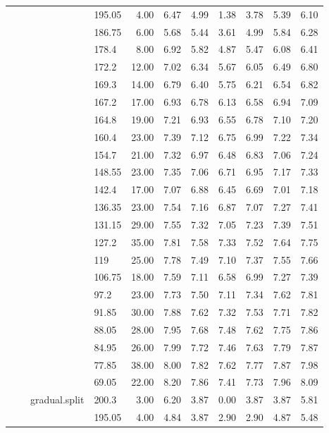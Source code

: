 \begin{longtable}{llllrrrrrrr}
   &  &  & 195.05 & 4.00 & 6.47 & 4.99 & 1.38 & 3.78 & 5.39 & 6.10 \\ 
   &  &  & 186.75 & 6.00 & 5.68 & 5.44 & 3.61 & 4.99 & 5.84 & 6.28 \\ 
   &  &  & 178.4 & 8.00 & 6.92 & 5.82 & 4.87 & 5.47 & 6.08 & 6.41 \\ 
   &  &  & 172.2 & 12.00 & 7.02 & 6.34 & 5.67 & 6.05 & 6.49 & 6.80 \\ 
   &  &  & 169.3 & 14.00 & 6.79 & 6.40 & 5.75 & 6.21 & 6.54 & 6.82 \\ 
   &  &  & 167.2 & 17.00 & 6.93 & 6.78 & 6.13 & 6.58 & 6.94 & 7.09 \\ 
   &  &  & 164.8 & 19.00 & 7.21 & 6.93 & 6.55 & 6.78 & 7.10 & 7.20 \\ 
   &  &  & 160.4 & 23.00 & 7.39 & 7.12 & 6.75 & 6.99 & 7.22 & 7.34 \\ 
   &  &  & 154.7 & 21.00 & 7.32 & 6.97 & 6.48 & 6.83 & 7.06 & 7.24 \\ 
   &  &  & 148.55 & 23.00 & 7.35 & 7.06 & 6.71 & 6.95 & 7.17 & 7.33 \\ 
   &  &  & 142.4 & 17.00 & 7.07 & 6.88 & 6.45 & 6.69 & 7.01 & 7.18 \\ 
   &  &  & 136.35 & 23.00 & 7.54 & 7.16 & 6.87 & 7.07 & 7.27 & 7.41 \\ 
   &  &  & 131.15 & 29.00 & 7.55 & 7.32 & 7.05 & 7.23 & 7.39 & 7.51 \\ 
   &  &  & 127.2 & 35.00 & 7.81 & 7.58 & 7.33 & 7.52 & 7.64 & 7.75 \\ 
   &  &  & 119 & 25.00 & 7.78 & 7.49 & 7.10 & 7.37 & 7.55 & 7.66 \\ 
   &  &  & 106.75 & 18.00 & 7.59 & 7.11 & 6.58 & 6.99 & 7.27 & 7.39 \\ 
   &  &  & 97.2 & 23.00 & 7.73 & 7.50 & 7.11 & 7.34 & 7.62 & 7.81 \\ 
   &  &  & 91.85 & 30.00 & 7.88 & 7.62 & 7.32 & 7.53 & 7.71 & 7.82 \\ 
   &  &  & 88.05 & 28.00 & 7.95 & 7.68 & 7.48 & 7.62 & 7.75 & 7.86 \\ 
   &  &  & 84.95 & 26.00 & 7.99 & 7.72 & 7.46 & 7.63 & 7.79 & 7.87 \\ 
   &  &  & 77.85 & 38.00 & 8.00 & 7.82 & 7.62 & 7.77 & 7.87 & 7.98 \\ 
   &  &  & 69.05 & 22.00 & 8.20 & 7.86 & 7.41 & 7.73 & 7.96 & 8.09 \\ 
   &  & gradual.split & 200.3 & 3.00 & 6.20 & 3.87 & 0.00 & 3.87 & 3.87 & 5.81 \\ 
   &  &  & 195.05 & 4.00 & 4.84 & 3.87 & 2.90 & 2.90 & 4.87 & 5.48 \\ 

\end{longtable}
